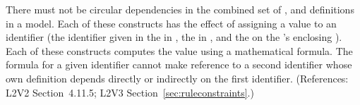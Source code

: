 There must not be circular dependencies in the combined set of
\InitialAssignment, \AssignmentRule and \KineticLaw definitions in a model.
Each of these constructs has the effect of assigning a value to an
identifier (\ie the identifier given in the   in
\InitialAssignment, the   in \AssignmentRule, and the
  on the \KineticLaw's enclosing \Reaction).  Each of these
constructs computes the value using a mathematical formula.  The formula
for a given identifier cannot make reference to a second identifier whose
own definition depends directly or indirectly on the first identifier.
(References: L2V2 Section~4.11.5; L2V3 Section~\ref{sec:ruleconstraints}.)
